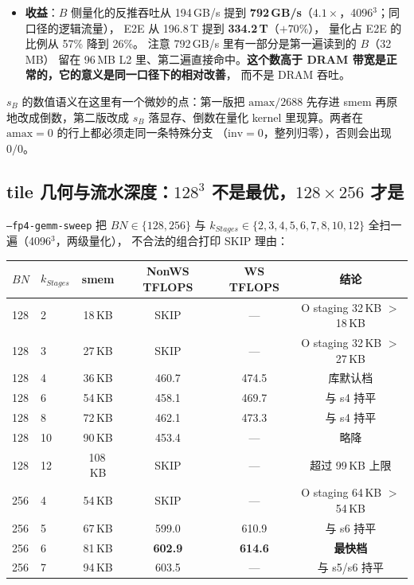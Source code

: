 \begin{itemize}[itemsep=2pt,topsep=3pt]
        $s_B$ 清零这一点也被写进约定（\texttt{cudaMemsetAsync}，
        浮点 $0$ 的位模式正是 \texttt{atomicMax} 的单位元）。
        转置量化的写法改动（tile 从 128 列 $\times$ 全 K 变成
        128 列 $\times$ 64 K）不改变任何中间值。
        \texttt{book/\allowbreak tests/\allowbreak ch36\_fp4\_quantize.cu} 的 8704 个 SF 落点
        与逐 bit 数据比对、以及 ch37 的
        \texttt{bit-exact=YES} 断言，就是这条约束的验证手段。
  \item \textbf{收益}：$B$ 侧量化的反推吞吐从 194\,GB/s 提到
        \textbf{792\,GB/s}（$4.1\times$，4096$^3$；同口径的逻辑流量），
        E2E 从 196.8\,T 提到 \textbf{334.2\,T}（$+70\%$），
        量化占 E2E 的比例从 57\% 降到 26\%。
        注意 792\,GB/s 里有一部分是第一遍读到的 $B$（32\,MB）
        留在 96\,MB L2 里、第二遍直接命中。\textbf{这个数高于
        DRAM 带宽是正常的，它的意义是同一口径下的相对改善}，
        而不是 DRAM 吞吐。
\end{itemize}

$s_B$ 的数值语义在这里有一个微妙的点：第一版把 $\mathrm{amax}/2688$
先存进 smem 再原地改成倒数，第二版改成 $s_B$ 落显存、倒数在量化 kernel
里现算。两者在 $\mathrm{amax}=0$ 的行上都必须走同一条特殊分支
（$\mathrm{inv}=0$，整列归零），否则会出现 $0/0$。

\subsection{tile 几何与流水深度：$128^3$ 不是最优，$128\times256$ 才是}

\texttt{--fp4-gemm-sweep} 把 $BN\in\{128,256\}$ 与
$k_{Stages}\in\{2,3,4,5,6,7,8,10,12\}$ 全扫一遍（4096$^3$，两级量化），
不合法的组合打印 SKIP 理由：

\begin{center}
\footnotesize
\begin{tabular}{llcccc}
\toprule
$BN$ & $k_{Stages}$ & smem & NonWS TFLOPS & WS TFLOPS & 结论 \\
\midrule
128 & 2  & 18\,KB & SKIP & --- & O staging 32\,KB $>$ 18\,KB \\
128 & 3  & 27\,KB & SKIP & --- & O staging 32\,KB $>$ 27\,KB \\
128 & 4  & 36\,KB & 460.7 & 474.5 & 库默认档 \\
128 & 6  & 54\,KB & 458.1 & 469.7 & 与 s4 持平 \\
128 & 8  & 72\,KB & 462.1 & 473.3 & 与 s4 持平 \\
128 & 10 & 90\,KB & 453.4 & --- & 略降 \\
128 & 12 & 108\,KB & SKIP & --- & 超过 99\,KB 上限 \\
256 & 4  & 54\,KB & SKIP & --- & O staging 64\,KB $>$ 54\,KB \\
256 & 5  & 67\,KB & 599.0 & 610.9 & 与 s6 持平 \\
256 & 6  & 81\,KB & \textbf{602.9} & \textbf{614.6} & \textbf{最快档} \\
256 & 7  & 94\,KB & 603.5 & --- & 与 s5/s6 持平 \\
\bottomrule
\end{tabular}
\end{center}

